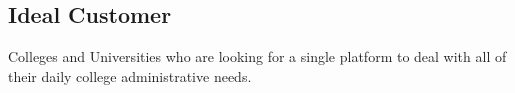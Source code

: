 \subsection{Ideal Customer}
\hspace{1cm}Colleges and Universities who are looking for a single platform to deal with all of their daily college administrative needs.